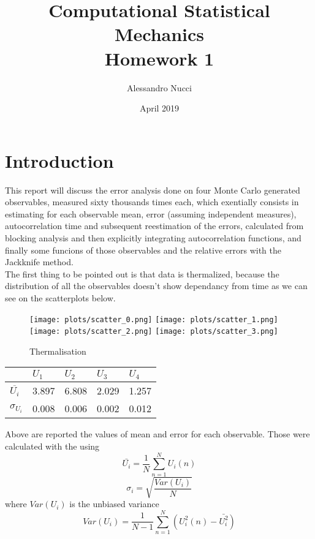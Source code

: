 \documentclass{article}
\title{Computational Statistical Mechanics\\Homework 1}
\author{Alessandro Nucci}
\date{April 2019}
\begin{document}
\maketitle
\section{Introduction}
This report will discuss the error analysis done on four Monte Carlo generated observables, measured
sixty thousands times each, which exentially consists in estimating for each observable mean,
error (assuming independent measures), autocorrelation time and subsequent reestimation of the errors,
calculated from blocking analysis and then explicitly integrating autocorrelation functions, and finally
some funcions of those observables and the relative errors with the Jackknife method.\\
The first thing to be pointed out is that data is thermalized, because the distribution of all the
observables doesn't show dependancy from time as we can see on the scatterplots below.
\begin{figure}[h!]
\centering
\texttt{[image: plots/scatter\_0.png]}%
\texttt{[image: plots/scatter\_1.png]}
\texttt{[image: plots/scatter\_2.png]}%
\texttt{[image: plots/scatter\_3.png]}
\caption{Thermalisation}
\end{figure}

\begin{table}[h!]
\centering
\begin{tabular}{|l|l|l|l|l|}
\hline
 & $U_1$ & $U_2$ & $U_3$ & $U_4$ \\
 \hline
 $\overline{U_i}$ & 3.897 & 6.808 & 2.029 & 1.257 \\
 \hline
 $\sigma_{U_i}$ & 0.008 & 0.006 & 0.002 & 0.012 \\
 \hline
\end{tabular}
\end{table}
Above are reported the values of mean and error for each observable.
Those were calculated with the using
\begin{equation}
\bar{ U_i } =\frac{1}{N}\sum_{n=1}^{N}{U_i(n)}
\end{equation}
\begin{equation}
\sigma_i=\sqrt{\frac{Var(U_i)}{N}}
\end{equation}
where $Var(U_i)$ is the unbiased variance
\begin{equation}
Var(U_i) =\frac{1}{N-1}\sum_{n=1}^N (U_i^2(n) - \bar{U_i^2})
\end{equation}
\end{document}
